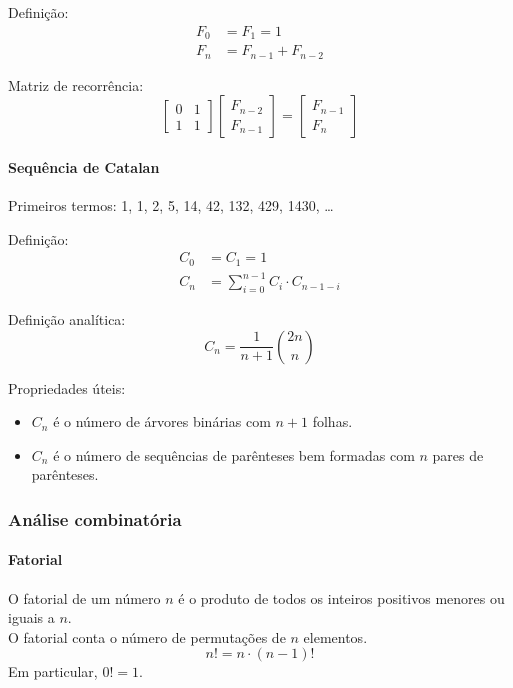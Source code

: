 Definição:
\begin{align*}
F_0 &= F_1 = 1 \\
F_n &= F_{n-1} + F_{n-2}
\end{align*}

Matriz de recorrência:
\[
\begin{bmatrix}
0 & 1 \\
1 & 1
\end{bmatrix}
\begin{bmatrix}
F_{n-2} \\
F_{n-1}
\end{bmatrix}
=
\begin{bmatrix}
F_{n-1} \\
F_n
\end{bmatrix}
\]

\paragraph{Sequência de Catalan}

Primeiros termos: 1, 1, 2, 5, 14, 42, 132, 429, 1430, \dots

Definição:
\begin{align*}
C_0 &= C_1 = 1 \\
C_n &= \sum_{i=0}^{n-1} C_i \cdot C_{n-1-i}
\end{align*}

Definição analítica:
\[
C_n = \frac{1}{n+1} \binom{2n}{n}
\]

Propriedades úteis:
\begin{itemize}\setlength\itemsep{0pt}
    \item $C_n$ é o número de árvores binárias com $n + 1$ folhas.
    \item $C_n$ é o número de sequências de parênteses bem formadas com $n$ pares de parênteses.
\end{itemize}

\subsubsection{Análise combinatória}

\paragraph{Fatorial}

O fatorial de um número $n$ é o produto de todos os inteiros positivos menores ou iguais a $n$.\\
O fatorial conta o número de permutações de $n$ elementos.
\[
n! = n \cdot (n - 1)!
\]
Em particular, $0! = 1$.

